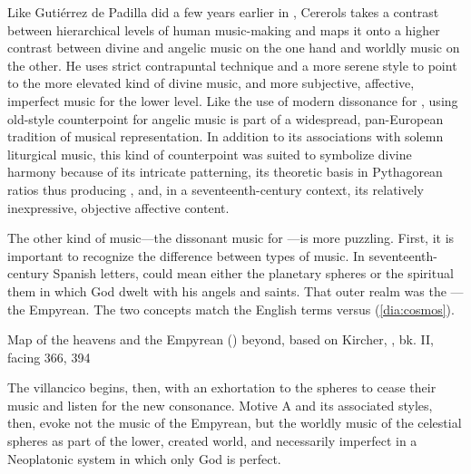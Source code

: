 Like Gutiérrez de Padilla did a few years earlier in , Cererols takes a contrast between hierarchical levels of human
music-making and maps it onto a higher contrast between divine and angelic music
on the one hand and worldly music on the other.
He uses strict contrapuntal technique and a more serene style to point to the
more elevated kind of divine music, and more subjective, affective,
imperfect music for the lower level.
Like the use of modern dissonance for , using old-style
counterpoint for angelic music is part of a widespread, pan-European tradition
of musical representation.
In addition to its associations with solemn liturgical music, this kind of
counterpoint was suited to symbolize divine harmony because of its intricate
patterning, its theoretic basis in Pythagorean ratios thus producing
, and, in a seventeenth-century context, its relatively
inexpressive, objective affective content.

The other kind of music---the dissonant music for ---is more puzzling.
First, it is important to recognize the difference between types of
 music.
In seventeenth-century Spanish letters,  could mean either the
planetary spheres or the spiritual  them in which God dwelt
with his angels and saints.
That outer realm was the ---the Empyrean.
The two concepts match the English terms  versus
 (\cref{dia:cosmos}).

{Map of the heavens and the Empyrean () beyond, based on
Kircher, , bk. II, facing 366, 394}

The villancico begins, then, with an exhortation to the spheres to cease their
music and listen for the new consonance. 
Motive A and its associated styles, then, evoke not the music of the Empyrean,
but the worldly music of the celestial spheres as part of the lower, created
world, and necessarily imperfect in a Neoplatonic system in which only God is
perfect.

